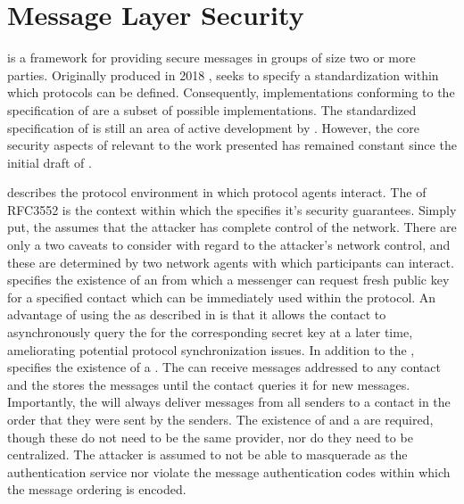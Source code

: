 \hypertarget{message-layer-security}{%
\section{Message Layer Security}\label{message-layer-security}}

 \autocite{Omara2020} is a framework for providing secure messages in groups of size two or more parties.
Originally produced in 2018 \autocite{ietf-mls-architecture-02},  seeks to specify a standardization within which  protocols can be defined.
Consequently, implementations conforming to the specification of  are a subset of possible  implementations.
The standardized specification of  is still an area of active development by .
However, the core security aspects of  relevant to the work presented has remained constant since the initial draft of .

 describes the protocol environment in which protocol agents interact.
The  of RFC3552 \autocite{rescorla2003rfc3552} is the context within which the  specifies it's security guarantees.
Simply put, the  assumes that the attacker has complete control of the network.
There are only a two caveats to consider with regard to the attacker's network control, and these are determined by two network agents with which  participants can interact.
 specifies the existence of an  from which a messenger can request fresh public key for a specified contact which can be immediately used within the  protocol.
An advantage of using the  as described in  is that it allows the contact to asynchronously query the  for the corresponding secret key at a later time, ameliorating potential protocol synchronization issues.
In addition to the ,  specifies the existence of a .
The  can receive messages addressed to any contact and the  stores the messages until the contact queries it for new messages.
Importantly, the  will always deliver messages from all senders to a contact in the order that they were sent by the senders.
The existence of  and a  are required, though these do not need to be the same provider, nor do they need to be centralized.
The attacker is assumed to not be able to masquerade as the authentication service nor violate the message authentication codes within which the message ordering is encoded.

